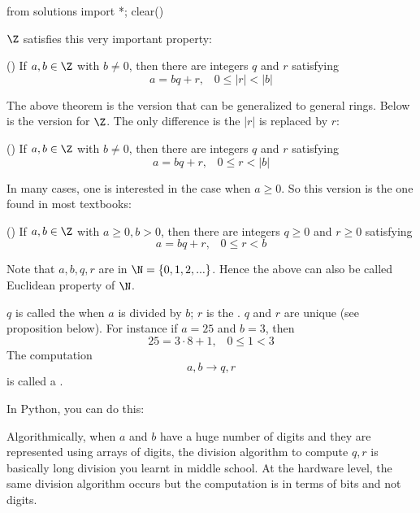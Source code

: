 \begin{python0}
from solutions import *; clear()
\end{python0}

$\Z$ satisfies this very important property:

\begin{thm}\label{euclideanproperty}
  \textnormal{()}
  If $a, b \in \Z$ with $b \neq 0$, then there are
  integers $q$ and $r$ 
  satisfying
  \[
  a = bq + r, \,\,\,\,\, 0 \leq |r| < |b|
  \]
\end{thm}

The above theorem is the version that can be generalized to general
rings.
Below is the version for $\Z$.
The only difference is the $|r|$ is replaced by $r$:
\begin{thm}\label{euclideanproperty2}
  \textnormal{()}
  If $a, b \in \Z$ with $b \neq 0$, then there are
  integers $q$ and $r$ 
  satisfying
  \[
  a = bq + r, \,\,\,\,\, 0 \leq r < |b|
  \]
\end{thm}

In many cases, one is interested in the case when $a \geq 0$.
So this version is the one found in most textbooks:

\begin{thm}\label{euclideanproperty3}
  \textnormal{()}
  If $a, b \in \Z$ with $a \geq 0, b > 0$, then there are
  integers $q \geq 0$ and $r \geq 0$ 
  satisfying
  \[
  a = bq + r, \,\,\,\,\, 0 \leq r < b
  \]
\end{thm}
Note that $a, b, q, r$ are in $\N = \{0, 1, 2, ...\}$.
Hence the above can also be called Euclidean property of $\N$.

$q$ is called the
when $a$ is divided by $b$; $r$ is the
.
$q$ and $r$ are unique (see proposition below).
For instance if $a = 25$ and $b = 3$, then
\[
25 = 3 \cdot 8 + 1, \,\,\,\,\, 0 \leq 1 < 3
\]
The computation
\[
a,b \rightarrow q, r
\]
is called a
.

In Python, you can do this:
Algorithmically, when $a$ and $b$ have a huge number of digits
and they are represented using arrays of digits, the division
algorithm to compute $q,r$ is basically long division you learnt in middle
school.
At the hardware level, the same division algorithm occurs but
the computation is in terms of bits and not digits.

